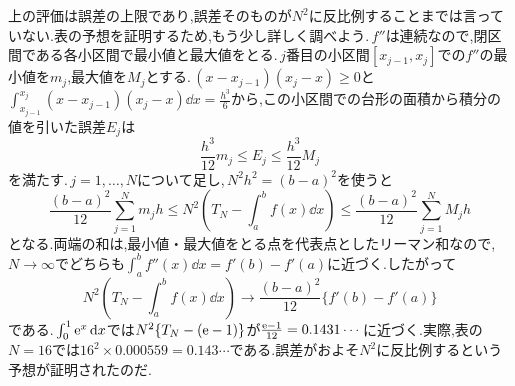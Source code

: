 上の評価は誤差の上限であり,誤差そのものが$N^2$に反比例することまでは言っていない.表の予想を証明するため,もう少し詳しく調べよう.\,$f''$は連続なので,閉区間である各小区間で最小値と最大値をとる.\,$j$番目の小区間$[x_{j-1},x_j]$での$f''$の最小値を$m_j$,最大値を$M_j$とする.\,$(x-x_{j-1})(x_j-x)\ge0$と$\int_{x_{j-1}}^{x_j}(x-x_{j-1})(x_j-x)\dd x=\frac{h^3}{6}$から,この小区間での台形の面積から積分の値を引いた誤差$E_j$は
\[
 \frac{h^3}{12}m_j\le E_j\le\frac{h^3}{12}M_j
\]
を満たす.\,$j=1,\ldots,N$について足し,\,$N^2h^2=(b-a)^2$を使うと
\[
 \frac{(b-a)^2}{12}\sum_{j=1}^{N}m_jh
 \le N^2\left(T_N-\int_a^bf(x)\dd x\right)
 \le\frac{(b-a)^2}{12}\sum_{j=1}^{N}M_jh
\]
となる.両端の和は,最小値・最大値をとる点を代表点としたリーマン和なので,\,$N\to\infty$でどちらも$\int_a^bf''(x)\dd x=f'(b)-f'(a)$に近づく.したがって
\[
 N^2\left(T_N-\int_a^bf(x)\dd x\right)
 \longrightarrow\frac{(b-a)^2}{12}\{f'(b)-f'(a)\}
\]
である.\,$\int_0^1\mathrm{e}^x\,\mathrm{d} x$では$N^2\{T_N-(\mathrm{e}-1)\}$が$\frac{\mathrm{e}-1}{12}=0.1431\cdots$に近づく.実際,表の$N=16$では$16^2\times0.000559=0.143\cdots$である.誤差がおよそ$N^2$に反比例するという予想が証明されたのだ.
